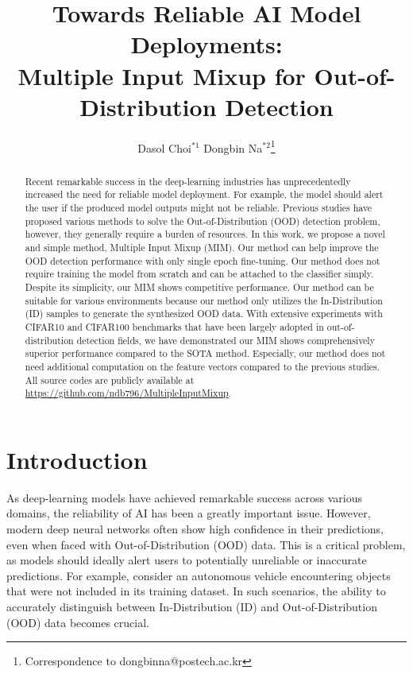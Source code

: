 \documentclass[letterpaper]{article} %
\title{Towards Reliable AI Model Deployments:\\Multiple Input Mixup for Out-of-Distribution Detection}
\author {
    Dasol Choi$^{*1}$ \;
    \stepcounter{footnote}Dongbin Na$^{*2}$\thanks{Correspondence to dongbinna@postech.ac.kr}
}
\begin{document}
\maketitle
\def\thefootnote{*}
\begin{abstract}
Recent remarkable success in the deep-learning industries has unprecedentedly increased the need for reliable model deployment.
For example, the model should alert the user if the produced model outputs might not be reliable.
Previous studies have proposed various methods to solve the Out-of-Distribution (OOD) detection problem, however, they generally require a burden of resources.
In this work, we propose a novel and simple method, Multiple Input Mixup (MIM).
Our method can help improve the OOD detection performance with only single epoch fine-tuning.
Our method does not require training the model from scratch and can be attached to the classifier simply.
Despite its simplicity, our MIM shows competitive performance.
Our method can be suitable for various environments because our method only utilizes the In-Distribution (ID) samples to generate the synthesized OOD data.
With extensive experiments with CIFAR10 and CIFAR100 benchmarks that have been largely adopted in out-of-distribution detection fields, we have demonstrated our MIM shows comprehensively superior performance compared to the SOTA method.
Especially, our method does not need additional computation on the feature vectors compared to the previous studies.
All source codes are publicly available at \textcolor{blue}{\url{https://github.com/ndb796/MultipleInputMixup}}.
\end{abstract}
\section{Introduction}
As deep-learning models have achieved remarkable success across various domains, the reliability of AI has been a greatly important issue.
However, modern deep neural networks often show high confidence in their predictions, even when faced with Out-of-Distribution (OOD) data.
This is a critical problem, as models should ideally alert users to potentially unreliable or inaccurate predictions.
For example, consider an autonomous vehicle encountering objects that were not included in its training dataset. In such scenarios, the ability to accurately distinguish between In-Distribution (ID) and Out-of-Distribution (OOD) data becomes crucial.
\end{document}
